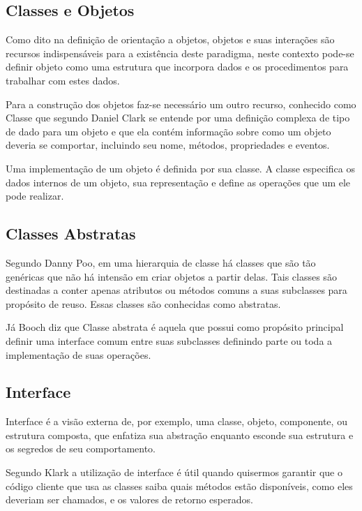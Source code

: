 \subsection{Classes e Objetos}	

Como dito na definição de orientação a objetos, objetos e suas interações  são recursos indispensáveis para a existência deste paradigma, neste contexto pode-se definir objeto como uma estrutura que incorpora dados e os procedimentos para trabalhar com estes dados.

Para a construção dos objetos faz-se necessário  um outro recurso, conhecido como Classe que segundo Daniel Clark se entende por uma definição complexa de tipo de dado para um objeto e que ela contém informação sobre como um objeto deveria se comportar, incluindo seu nome, métodos, propriedades e eventos.   
  
Uma implementação de um objeto é definida por sua classe. A classe especifica os dados internos de um objeto, sua representação e define as operações que um ele pode realizar. \cite{dan}


\subsection{Classes Abstratas}	

Segundo Danny Poo, em uma hierarquia de classe há classes que são tão genéricas que não há intensão em criar objetos a partir delas. Tais classes são destinadas a conter apenas atributos ou métodos comuns a suas subclasses para propósito de reuso. Essas classes são conhecidas como abstratas. \cite{dany}
  
Já Booch diz que Classe abstrata é aquela que possui como propósito principal definir uma interface comum entre suas subclasses definindo parte ou toda a implementação de suas operações.  \cite{gra}


\subsection{Interface}	
Interface é a visão externa de, por exemplo, uma classe, objeto, componente, ou estrutura composta, que enfatiza sua abstração enquanto esconde sua estrutura e os segredos de seu comportamento. \cite{gra}  

Segundo Klark  a utilização de interface é útil quando quisermos garantir que o código cliente que usa as classes saiba quais métodos estão disponíveis, como eles deveriam ser chamados, e os valores de retorno esperados. \cite{dan}

